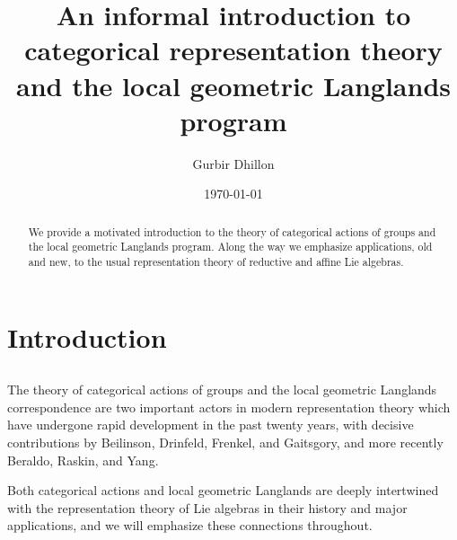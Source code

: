 \documentclass[10pt]{amsart}
\title{}
\author{}
\theoremstyle{remark}
\numberwithin{equation}{section}
\begin{document}
	
	
	\title[Categorical representations and local geometric Langlands]{An 
	informal introduction to categorical representation theory and 
	the local geometric Langlands program}
	
	
	
	
	
	\author{Gurbir Dhillon}
	\address{Yale University \\ New Haven, CT
		06511, USA}
	
	
	
	
	
	
	
	\date{\today}
	
	
	\begin{abstract}  We provide a motivated introduction to the theory of 
	categorical actions of groups and the local geometric Langlands 
	program. Along the way we emphasize applications, old and new, to 
	the usual representation theory of reductive and affine Lie algebras.  
	\end{abstract}
	
	\maketitle
	
	
\setcounter{tocdepth}{1}
\tableofcontents

	
	
	\section{Introduction}
	\subsection{} The theory of categorical actions of groups and the local 
	geometric Langlands correspondence are two important actors in modern 
	representation theory which have undergone rapid development in the past 
	twenty years, with decisive contributions by Beilinson, Drinfeld, Frenkel, and Gaitsgory, and more recently Beraldo, Raskin, and Yang. 
	
	Both categorical actions and local geometric 
	Langlands are deeply intertwined with the representation theory of Lie 
	algebras in their history and major 
	applications, and we will 
	emphasize these connections throughout.
\end{document}
